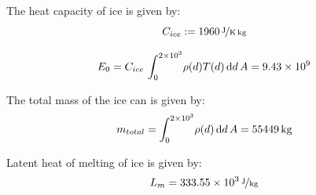 \begin{figure}[htb]
	\centering
	\captionsetup[subfigure]{width=0.45\textwidth}
	\caption{}
\end{figure}

The heat capacity of ice is given by\cite{website:iceHeatCapacity}:
\begin{equation}
	C_{ice} := \unitfrac[1960]{J}{K \, kg}
\end{equation}

\begin{equation}
	E_0 = C_{ice} \, \int_0^{2\times 10^{3}} \! \rho(d) T(d) \, \mathrm{d}d \, A = 9.43 \times 10^{9}
\end{equation}

The total mass of the ice can is given by:
\begin{equation}
	m_{total} = \int_0^{2\e{3}} \! \rho(d) \, \mathrm{d}d \, A = \unit[55449]{kg}
\end{equation}

Latent heat of melting of ice is given by\cite{website:waterLatentHeat}:
\begin{equation}
	L_m = \unitfrac[333.55 \e{3}]{J}{kg}
\end{equation}

